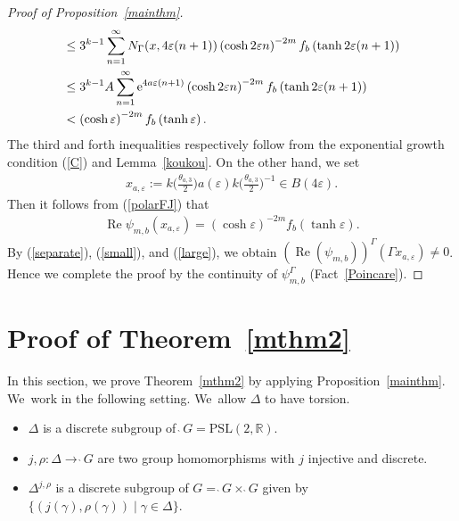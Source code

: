 \documentclass[pdftex]{sigma}
\numberwithin{equation}{section}
\begin{document}
\begin{proof}[Proof of Proposition~\ref{mainthm}]
\begin{align}
&\leq 3^{k-1}\sum_{n = 1}^{\infty} N_{\Gamma}(x, 4\varepsilon (n + 1))\left(\cosh
2\varepsilon n \right)^{-2m} f_{b}\left(\tanh 2\varepsilon (n+1)\right)
\nonumber \\
&\leq 3^{k-1}A\sum_{n = 1}^{\infty} {\rm e}^{4a\varepsilon (n+1)}\left(\cosh 2\varepsilon n
\right)^{-2m} f_{b}\left(\tanh 2\varepsilon (n+1)\right)
\nonumber \\
&< \left(\cosh \varepsilon\right)^{-2m} f_{b}
\left(\tanh \varepsilon\right).
\label{small}
\end{align}
The third and forth inequalities respectively follow from
the exponential growth condition (\ref{C}) and Lemma~\ref{koukou}.
On the other hand, we set
\begin{gather*}
x_{a,\varepsilon}:=
k\bigg(\frac{\theta_{a,3}}{2}\bigg)a(\varepsilon)k\bigg(\frac{\theta_{a,3}}{2}\bigg)^{-1} \in B(4\varepsilon).
\end{gather*}
Then it follows from (\ref{polarFJ}) that
\begin{align}
\label{large}
\operatorname{Re} \psi_{m,b}(x_{a,\varepsilon})
=\left(\cosh \varepsilon\right)^{-2m} f_{b}
\left(\tanh \varepsilon\right).
\end{align}
By (\ref{separate}), (\ref{small}), and (\ref{large}),
we obtain $(\operatorname{Re}(\psi_{m,b}))^{\Gamma}(\Gamma x_{a,\varepsilon})\neq 0$.
Hence we complete the proof
by the continuity of $\psi_{m,b}^{\Gamma}$ (Fact~\ref{Poincare}).
\end{proof}
\section{Proof of Theorem~\ref{mthm2}}
\label{proof-thm2-section}
In this section, we prove Theorem~\ref{mthm2}
by applying Proposition~\ref{mainthm}. We~work in the following setting. We~allow $\Delta$ to have torsion.
\begin{Setting}\quad
\label{setting}
\begin{itemize}\itemsep=0pt
\item
$\Delta$ is a discrete subgroup of $\grave{\ }G = \mathrm{PSL}(2,\mathbb{R})$.
\item
$j, \rho\colon\Delta\rightarrow\grave{\ }G$ are two group homomorphisms
with $j$ injective and discrete.
\item
$\Delta^{j,\rho}$ is a discrete subgroup of $G=\grave{\ }G\times\grave{\ }G$
given by $\{(j(\gamma),\rho(\gamma)) \mid \gamma \in \Delta\}$.
\end{itemize}
\end{Setting}
\end{document}
